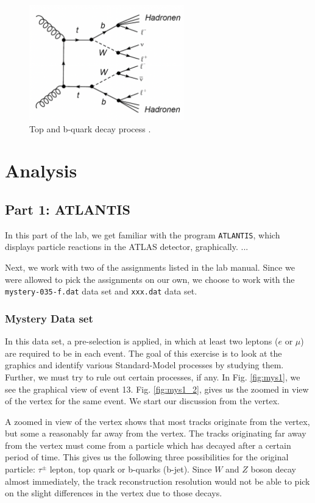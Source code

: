 \documentclass[a4paper]{report}
\numberwithin{equation}{section}
\begin{document}
\begin{figure}[htpb]
    \centering
    \includegraphics[width=0.6\textwidth]{bdecay}
    \caption{Top and b-quark decay process \cite{labman}.}
    \label{fig:bdecay}
\end{figure}

\chapter{Analysis} \label{chap:analysis}

\section{Part 1: ATLANTIS} \label{sec:atlantis}

In this part of the lab, we get familiar with the program \texttt{ATLANTIS}, which displays particle reactions in the ATLAS detector, graphically. 
...

Next, we work with two of the assignments listed in the lab manual. Since we were allowed to pick the assignments on our own, we choose to work with the \texttt{mystery-035-f.dat} data set and \texttt{xxx.dat} data set. 

\subsection{Mystery Data set}
In this data set, a pre-selection is applied, in which at least two leptons ($e$ or $\mu$) are required to be in each event. The goal of this exercise is to look at the graphics and identify various Standard-Model processes by studying them. Further, we must try to rule out certain processes, if any. In Fig. \ref{fig:mys1}, we see the graphical view of event 13. Fig. \ref{fig:mys1_2}, gives us the zoomed in view of the vertex for the same event. We start our discussion from the vertex. 

A zoomed in view of the vertex shows that most tracks originate from the vertex, but some a reasonably far away from the vertex. The tracks originating far away from the vertex must come from a particle which has decayed after a certain period of time. This gives us the following three possibilities for the original particle: $\tau^{\pm}$ lepton, top quark or b-quarks (b-jet). Since $W$ and $Z$ boson decay almost immediately, the track reconstruction resolution would not be able to pick on the slight differences in the vertex due to those decays. 
\end{document}
